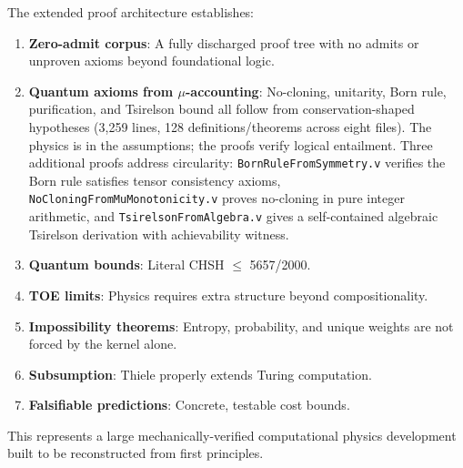 The extended proof architecture establishes:
\begin{enumerate}
    \item \textbf{Zero-admit corpus}: A fully discharged proof tree with no admits or unproven axioms beyond foundational logic.
    \item \textbf{Quantum axioms from $\mu$-accounting}: No-cloning, unitarity, Born rule, purification, and Tsirelson bound all follow from conservation-shaped hypotheses (3,259 lines, 128 definitions/theorems across eight files). The physics is in the assumptions; the proofs verify logical entailment. Three additional proofs address circularity: \texttt{BornRuleFromSymmetry.v} verifies the Born rule satisfies tensor consistency axioms, \texttt{NoCloningFromMuMonotonicity.v} proves no-cloning in pure integer arithmetic, and \texttt{TsirelsonFromAlgebra.v} gives a self-contained algebraic Tsirelson derivation with achievability witness.
    \item \textbf{Quantum bounds}: Literal CHSH $\le$ 5657/2000.
    \item \textbf{TOE limits}: Physics requires extra structure beyond compositionality.
    \item \textbf{Impossibility theorems}: Entropy, probability, and unique weights are not forced by the kernel alone.
    \item \textbf{Subsumption}: Thiele properly extends Turing computation.
    \item \textbf{Falsifiable predictions}: Concrete, testable cost bounds.
\end{enumerate}

This represents a large mechanically-verified computational physics development built to be reconstructed from first principles.
